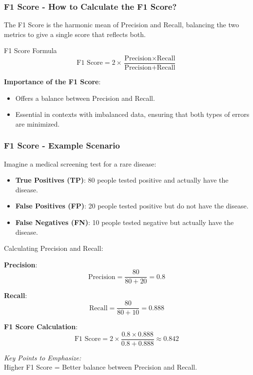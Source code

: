 \documentclass[aspectratio=169]{beamer}
\begin{document}
\begin{frame}[fragile]
    \frametitle{F1 Score - How to Calculate the F1 Score?}
    The F1 Score is the harmonic mean of Precision and Recall, balancing the two metrics to give a single score that reflects both. 

    \begin{block}{F1 Score Formula}
        \begin{equation}
            \text{F1 Score} = 2 \times \frac{\text{Precision} \times \text{Recall}}{\text{Precision} + \text{Recall}}
        \end{equation}
    \end{block}

    \textbf{Importance of the F1 Score}:
    \begin{itemize}
        \item Offers a balance between Precision and Recall.
        \item Essential in contexts with imbalanced data, ensuring that both types of errors are minimized.
    \end{itemize}
\end{frame}

\begin{frame}[fragile]
    \frametitle{F1 Score - Example Scenario}
    Imagine a medical screening test for a rare disease:
    \begin{itemize}
        \item \textbf{True Positives (TP)}: 80 people tested positive and actually have the disease.
        \item \textbf{False Positives (FP)}: 20 people tested positive but do not have the disease.
        \item \textbf{False Negatives (FN)}: 10 people tested negative but actually have the disease.
    \end{itemize}

    Calculating Precision and Recall:
    
    \textbf{Precision}:
    \[
    \text{Precision} = \frac{80}{80 + 20} = 0.8
    \]
    
    \textbf{Recall}:
    \[
    \text{Recall} = \frac{80}{80 + 10} = 0.888
    \]

    \textbf{F1 Score Calculation}:
    \[
    \text{F1 Score} = 2 \times \frac{0.8 \times 0.888}{0.8 + 0.888} \approx 0.842
    \]
    
    \textit{Key Points to Emphasize:} \\
    Higher F1 Score = Better balance between Precision and Recall.
\end{frame}
\end{document}
